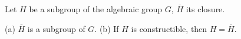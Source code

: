 Let $H$ be a subgroup of the algebraic group $G$, $\overline{H}$ its closure.

(a) $\overline{H}$ is a subgroup of $G$.
(b) If $H$ is constructible, then $H = \overline{H}$.

